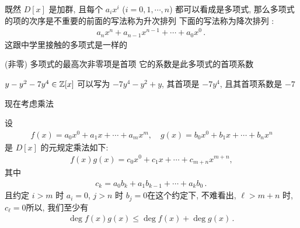 \begin{remark}
    既然 $D[x]$ 是加群, 且每个 $a_i x^i$ ($i = 0,1,\cdots,n$) 都可以看成是多项式, 那么多项式的项的次序是不重要的\period 前面的写法称为升次排列 \period 下面的写法称为降次排列 :
    \begin{align*}
        a_n x^n + a_{n-1} x^{n-1} + \cdots + a_0 x^0 \period
    \end{align*}
    这跟中学里接触的多项式是一样的\period

    (非零) 多项式的最高次非零项是首项 \period 它的系数是此多项式的首项系数 \period
\end{remark}

\begin{example}
    $y - y^2 - 7y^4 \in \mathbb{Z}[x]$ 可以写为 $-7y^4 - y^2 + y$, 其首项是 $-7y^4$, 且其首项系数是 $-7$\period
\end{example}

现在考虑乘法\period

\begin{definition}
    设
    \begin{align*}
        f(x) = a_0 x^0 + a_1 x + \cdots + a_m x^m, \quad g(x) = b_0 x^0 + b_1 x + \cdots + b_n x^n
    \end{align*}
    是 $D[x]$ 的元\period 规定乘法如下:
    \begin{align*}
        f(x) g(x) = c_0 x^0 + c_1 x + \cdots + c_{m+n} x^{m+n},
    \end{align*}
    其中
    \begin{align*}
        c_k = a_0 b_k + a_1 b_{k-1} + \cdots + a_k b_0 \period
    \end{align*}
    且约定 $i > m$ 时 $a_i = 0$, $j > n$ 时 $b_j = 0$\period 在这个约定下, 不难看出, $\ell > m+n$ 时, $c_\ell = 0$\period 所以, 我们至少有
    \begin{align*}
        \deg f(x)g(x) \leq \deg f(x) + \deg g(x) \period
    \end{align*}
\end{definition}

